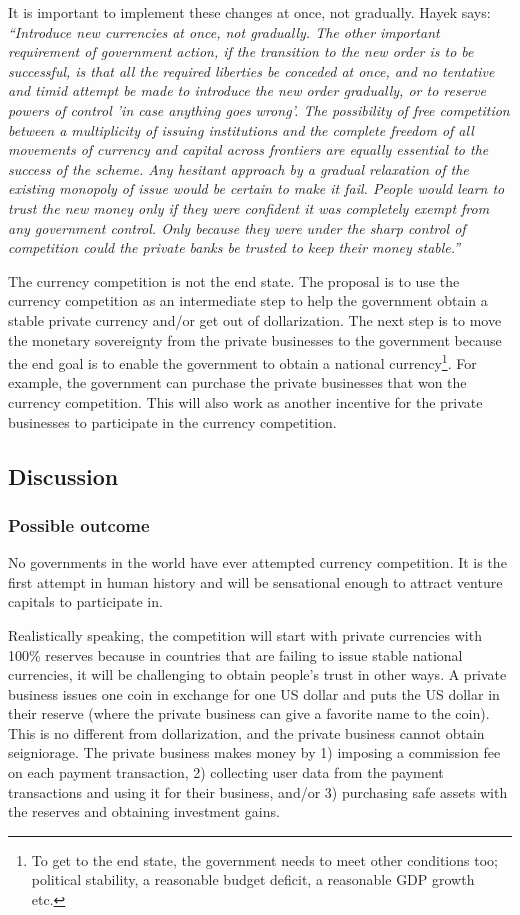 \documentclass[dvipdfmx,a4paper]{article}
\begin{document}
It is important to implement these changes at once, not gradually. Hayek says: \textit{``Introduce new currencies at once, not gradually. The other important requirement of government action, if the transition to the new order is to be successful, is that all the required liberties be conceded at once, and no tentative and timid attempt be made to introduce the new order gradually, or to reserve powers of control 'in case anything goes wrong'. The possibility of free competition between a multiplicity of issuing institutions and the complete freedom of all movements of currency and capital across frontiers are equally essential to the success of the scheme. Any hesitant approach by a gradual relaxation of the existing monopoly of issue would be certain to make it fail. People would learn to trust the new money only if they were confident it was completely exempt from any government control. Only because they were under the sharp control of competition could the private banks be trusted to keep their money stable.''}

The currency competition is not the end state. The proposal is to use the currency competition as an intermediate step to help the government obtain a stable private currency and/or get out of dollarization. The next step is to move the monetary sovereignty from the private businesses to the government because the end goal is to enable the government to obtain a national currency\footnote{To get to the end state, the government needs to meet other conditions too; political stability, a reasonable budget deficit, a reasonable GDP growth etc.}. For example, the government can purchase the private businesses that won the currency competition. This will also work as another incentive for the private businesses to participate in the currency competition.

\subsection{Discussion}

\subsubsection{Possible outcome}

No governments in the world have ever attempted currency competition. It is the first attempt in human history and will be sensational enough to attract venture capitals to participate in.

Realistically speaking, the competition will start with private currencies with 100\% reserves because in countries that are failing to issue stable national currencies, it will be challenging to obtain people's trust in other ways. A private business issues one coin in exchange for one US dollar and puts the US dollar in their reserve (where the private business can give a favorite name to the coin). This is no different from dollarization, and the private business cannot obtain seigniorage. The private business makes money by 1) imposing a commission fee on each payment transaction, 2) collecting user data from the payment transactions and using it for their business, and/or 3) purchasing safe assets with the reserves and obtaining investment gains.
\end{document}
